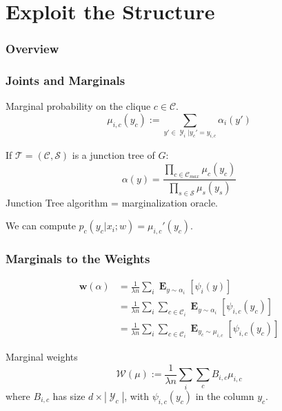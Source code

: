 \documentclass{beamer}
\DeclareMathOperator{\1}{\mathbb{1}}
\DeclareMathOperator{\E}{\mathbf{E}}
\DeclareMathOperator{\Y}{\mathcal{Y}}
\begin{document}
\section{Exploit the Structure}
\begin{frame}
	\frametitle{Overview}
	\tableofcontents[currentsection]  
\end{frame}
\begin{frame}
	\frametitle{Joints and Marginals}
	Marginal probability on the clique $c \in \mathcal C$.
	\begin{equation*}
	\label{marginals definition}
	\mu_{i, c}(y_c) := \sum_{y'\in \Y_i | y_c' = y_{i, c}} \alpha_i(y')
	\end{equation*}
	
	If $\mathcal T = (\mathcal C, \mathcal S)$ is a junction tree of $G$:
	\begin{equation}
		\label{joint from marginals}
		\alpha(y) = \frac{\prod_{c\in\mathcal{C}_{max}} \mu_c(y_c)}{\prod_{s\in\mathcal{S}} \mu_s(y_s)}
	\end{equation}
	Junction Tree algorithm = marginalization oracle.
	\begin{center}
		We can compute $p_c(y_c | x_i ; w) = \mu_{i,c}'(y_c)$.
	\end{center}

	
	
\end{frame}
\begin{frame}
	\frametitle{Marginals to the Weights}	
	
	\begin{align*}
	\bm w(\alpha)
	& = \frac{1}{\lambda n} \sum_i \E_{y \sim \alpha_i}[\psi_i(y)] \\
   	&  = \frac{1}{\lambda n} \sum_i \sum_{c \in \mathcal C_i} \E_{y \sim \alpha_i}  [\psi_{i, c}(y_c)]  \\
   	&  = \frac{1}{\lambda n} \sum_i \sum_{c \in \mathcal C_i} \E_{y_c \sim \mu_{i, c}}  [\psi_{i, c}(y_c)] 
	\end{align*}

\begin{block}{Marginal weights}
	\begin{equation*}
		\mathcal W (\mu) := \frac{1}{\lambda n} \sum_i \sum_c B_{i, c} \mu_{i, c}
	\end{equation*}
	where $B_{i, c}$ has size $d\times |\Y_c|$, with $\psi_{i, c}(y_c)$ in the column $y_c$.
\end{block}
	
\end{frame}
\end{document}
